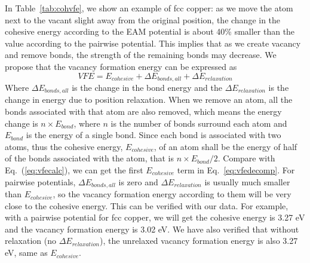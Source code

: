 \documentclass[%
 reprint,
 amsmath,amssymb,
 aps,
]{revtex4-1}
\begin{document}
In Table~\ref{tab:cohvfe}, we show an example of fcc copper: as we move the atom next to the vacant slight away from the original position, the change in the cohesive energy according to the EAM potential is about 40\% smaller than the value according to the pairwise potential.
This implies that as we create vacancy and remove bonds, the strength of the remaining bonds may decrease.
We propose that the vacancy formation energy can be expressed as
\begin{equation}
\label{eq:vfedecomp}
\mathit{VFE} = E_{cohesive} + \Delta E_{bonds, all} + \Delta E_{relaxation}
\end{equation}
Where $\Delta E_{bonds, all}$ is the change in the bond energy and the $\Delta E_{relaxation}$ is the change in energy due to position relaxation.
When we remove an atom, all the bonds associated with that atom are also removed, which means the energy change is $n \times E_{bond}$, where $n$ is the number of bonds surround each atom and $E_{bond}$ is the energy of a single bond.
Since each bond is associated with two atoms, thus the cohesive energy, $E_{cohesive}$, of an atom shall be the energy of half of the bonds associated with the atom, that is $n \times E_{bond}/2$.
Compare with Eq.~(\ref{eq:vfecalc}), we can get the first $E_{cohesive}$ term in Eq.~\ref{eq:vfedecomp}.
For pairwise potentials, $\Delta E_{bonds, all}$ is zero and $\Delta E_{relaxation}$ is usually much smaller than $E_{cohesive}$, so the vacancy formation energy according to them will be very close to the cohesive energy.
This can be verified with our data.
For example, with a pairwise potential for fcc copper, we will get the cohesive energy is 3.27 eV and the vacancy formation energy is 3.02 eV. We have also verified that without relaxation (no $\Delta E_{relaxation}$), the unrelaxed vacancy formation energy is also 3.27 eV, same as $E_{cohesive}$.
\end{document}
